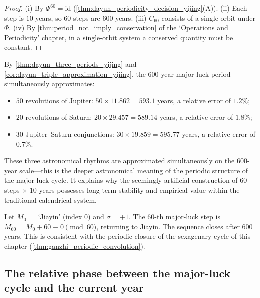 \begin{proof}
(i) By $\Phi^{60}=\mathrm{id}$ (\cref{thm:dayun_periodicity_decision_yijing}(A)).
(ii) Each step is $10$ years, so $60$ steps are $600$ years.
(iii) $C_{60}$ consists of a single orbit under $\Phi$.
(iv) By \cref{thm:period_not_imply_conservation} of the `Operations and Periodicity' chapter, in a single-orbit system a conserved quantity must be constant.
\end{proof}

\begin{remark}\label{rem:dayun_600_year_yijing}
By \cref{thm:dayun_three_periods_yijing} and \cref{cor:dayun_triple_approximation_yijing}, the $600$-year major-luck period simultaneously approximates:
\begin{itemize}
    \item $50$ revolutions of Jupiter: $50\times 11.862=593.1$ years, a relative error of $1.2\%$;
    \item $20$ revolutions of Saturn: $20\times 29.457=589.14$ years, a relative error of $1.8\%$;
    \item $30$ Jupiter--Saturn conjunctions: $30\times 19.859=595.77$ years, a relative error of $0.7\%$.
\end{itemize}
These three astronomical rhythms are approximated simultaneously on the $600$-year scale---this is the deeper astronomical meaning of the periodic structure of the major-luck cycle. It explains why the seemingly artificial construction of $60$ steps $\times$ $10$ years possesses long-term stability and empirical value within the traditional calendrical system.
\end{remark}

\begin{example}\label{ex:dayun_period_closure_yijing}
Let $M_0=$ `Jiayin' (index $0$) and $\sigma=+1$. The $60$-th major-luck step is $M_{60}=M_0+60\equiv 0\pmod{60}$, returning to Jiayin. The sequence closes after $600$ years. This is consistent with the periodic closure of the sexagenary cycle of this chapter (\cref{thm:ganzhi_periodic_convolution}).
\end{example}

\subsection{The relative phase between the major-luck cycle and the current year}

